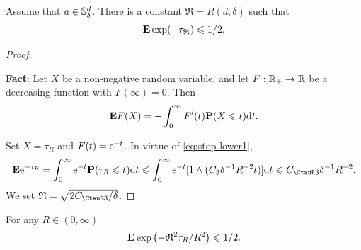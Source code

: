 \begin{lemma}
    Assume that \(a\in {\mathbb S}^d_{\delta}\). There is a constant $\mathfrak{R}=R(d,\delta)$ such that 
    \[
        {\mathbf E} \exp(-{\tau_{\mathfrak{R}}}) \leqslant 1/2. 
    \]
\end{lemma}
\begin{proof}
    \begin{framed}
        {\bf Fact}: Let $X$ be a non-negative random variable, and let $F:{\mathbb R}_+\to {\mathbb R}$ be a decreasing  function with $F(\infty)=0$. Then 
        \begin{equation*}
            {\mathbf E} F(X) = -\int_0^\infty F'(t) {\mathbf P} (X\leqslant t) \text{\rm{d}} t. 
        \end{equation*}
    \end{framed}
    Set $X=\tau_{R}$ and $F(t)=\mathrm{e}^{-t}$. In virtue of \eqref{eq:stop-lower1}, 
    \begin{equation*}
        \bE \e^{-\tau_{R}}=\int_0^\infty \e^{-t} \bP (\tau_R\leq t) \d t \leq \int_0^\infty \e^{-t} [1\wedge (C_{3}\delta^{-1}R^{-2}t)] \d t \leq C_{\CtauR3} \delta^{-1} R^{-2}. 
    \end{equation*}
    We set $\mathfrak{R}=\sqrt{2C_{\CtauR3}/\delta}$. 
\end{proof}
	
\begin{exercise}
    For any $R \in(0, \infty)$
    \begin{equation}\label{eq:exp-stop2}
        {\mathbf E} \exp \left(-\mathfrak{R}^2 \tau_R/R^2 \right) \leqslant 1 / 2 .
    \end{equation}
\end{exercise}
	
